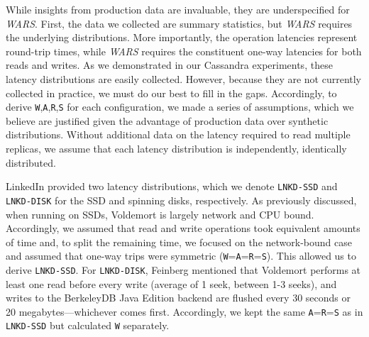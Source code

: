 \documentclass{vldb}
\begin{document}
While insights from production data are invaluable, they are
underspecified for \textit{WARS}.  First, the data we collected are
summary statistics, but \textit{WARS} requires the underlying
distributions.  More importantly, the operation latencies represent
round-trip times, while \textit{WARS} requires the constituent one-way
latencies for both reads and writes.  As we demonstrated in our
Cassandra experiments, these latency distributions are easily
collected.  However, because they are not currently collected in
practice, we must do our best to fill in the gaps. Accordingly, to
derive \texttt{W},\texttt{A},\texttt{R},\texttt{S} for each
configuration, we made a series of assumptions, which we believe are
justified given the advantage of production data over synthetic
distributions.  Without additional data on the latency required to
read multiple replicas, we assume that each latency distribution is
independently, identically distributed.

LinkedIn provided two latency distributions, which we denote
\texttt{LNKD-SSD} and \texttt{LNKD-DISK} for the SSD and spinning
disks, respectively.  As previously discussed, when running on SSDs,
Voldemort is largely network and CPU bound.  Accordingly, we assumed
that read and write operations took equivalent amounts of time and, to
split the remaining time, we focused on the network-bound case and
assumed that one-way trips were symmetric
(\texttt{W}=\texttt{A}=\texttt{R}=\texttt{S}).  This allowed us to
derive \texttt{LNKD-SSD}.  For \texttt{LNKD-DISK}, Feinberg mentioned
that Voldemort performs at least one read before every write (average
of 1 seek, between 1-3 seeks), and writes to the BerkeleyDB Java
Edition backend are flushed every 30 seconds or 20
megabytes---whichever comes first.  Accordingly, we kept the same
\texttt{A}=\texttt{R}=\texttt{S} as in \texttt{LNKD-SSD} but
calculated \texttt{W} separately.  
\end{document}

